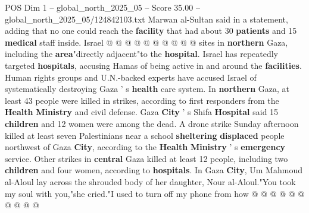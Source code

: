 \begin{textsample}{POS Dim 1 – global\_north\_2025\_05 – Score 35.00 – global\_north\_2025\_05/124842103.txt}
Marwan al-Sultan said in a statement, adding that no one could reach the \textbf{facility} that had about 30 \textbf{patients} and 15 \textbf{medical} staff inside.
Israel @ @ @ @ @ @ @ @ @ @ sites in \textbf{northern} Gaza, including the \textbf{area}"directly adjacent"to the \textbf{hospital}.
Israel has repeatedly targeted \textbf{hospitals}, accusing Hamas of being active in and around the \textbf{facilities}.
Human rights groups and U.N.-backed experts have accused Israel of systematically destroying Gaza ' s \textbf{health} care system.
In \textbf{northern} Gaza, at least 43 people were killed in strikes, according to first responders from the \textbf{Health} \textbf{Ministry} and civil defense.
Gaza \textbf{City} ' s Shifa \textbf{Hospital} said 15 \textbf{children} and 12 women were among the dead.
A drone strike Sunday afternoon killed at least seven Palestinians near a school \textbf{sheltering} \textbf{displaced} people northwest of Gaza \textbf{City}, according to the \textbf{Health} \textbf{Ministry} ' s \textbf{emergency} service.
Other strikes in \textbf{central} Gaza killed at least 12 people, including two \textbf{children} and four women, according to \textbf{hospitals}.
In Gaza \textbf{City}, Um Mahmoud al-Aloul lay across the shrouded body of her daughter, Nour al-Aloul."You took my soul with you,"she cried."I used to turn off my phone from how @ @ @ @ @ @ @ @ @ @

\end{textsample}
